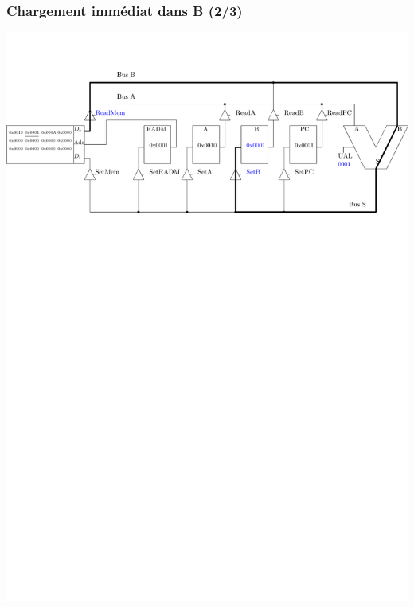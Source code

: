 \documentclass{beamer}
\begin{document}
\begin{frame}
\frametitle{Chargement immédiat dans B (2/3)}
\centering\includegraphics[width=\linewidth]{Figs/premier_chemin_ldb_2.pdf}
\end{frame}
\end{document}
